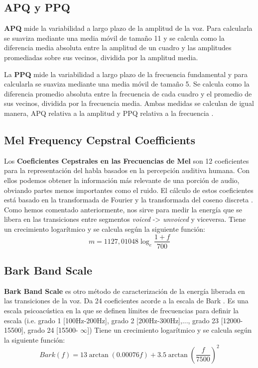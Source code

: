 \subsection{APQ y PPQ}
\textbf{APQ} mide la variabilidad a largo plazo de la amplitud de la voz. Para calcularla se suaviza mediante una media móvil de tamaño 11 y se calcula como la diferencia media absoluta entre la amplitud de un cuadro y las amplitudes promediadas sobre sus vecinos, dividida por la amplitud media.

La \textbf{PPQ} mide la variabilidad a largo plazo de la frecuencia fundamental y para calcularla se suaviza mediante una media móvil de tamaño 5. Se calcula como la diferencia promedio absoluta entre la frecuencia de cada cuadro y el promedio de sus vecinos, dividida por la frecuencia media. Ambas medidas se calculan de igual manera, APQ relativa a la amplitud y PPQ relativa a la frecuencia \cite{neurospeech}.

\subsection{Mel Frequency Cepstral Coefficients}
Los \textbf{Coeficientes Cepstrales en las Frecuencias de Mel} son 12 coeficientes para la representación del habla basados en la percepción auditiva humana. Con ellos podemos obtener la información más relevante de una porción de audio, obviando partes menos importantes como el ruido. El cálculo de estos coeficientes está basado en la transformada de Fourier y la transformada del coseno discreta \cite{wiki:mfcc}. Como hemos comentado anteriormente, nos sirve para medir la energía que se libera en las transiciones entre segmentos \textit{voiced} -> \textit{unvoiced} y viceversa. Tiene un crecimiento logarítmico y se calcula según la siguiente función:
\begin{equation}
m = 1127,01048\log _{e}\frac{1+f}{700}
\end{equation}

\subsection{Bark Band Scale}
\textbf{Bark Band Scale} es otro método de caracterización de la energía liberada en las transiciones de la voz. Da 24 coeficientes acorde a la escala de Bark \cite{bbe}. Es una escala psicoacústica en la que se definen límites de frecuencias para definir la escala (i.e. grado 1 [100Hz-200Hz], grado 2 [200Hz-300Hz],..., grado 23 [12000-15500], grado 24 [15500- $\infty$])
Tiene un crecimiento logarítmico y se calcula según la siguiente función:
\begin{equation}
Bark(f) = 13 \arctan(0.00076 f)+ 3.5 \arctan \left ( \frac{f}{7500} \right )^{2}
\end{equation}


